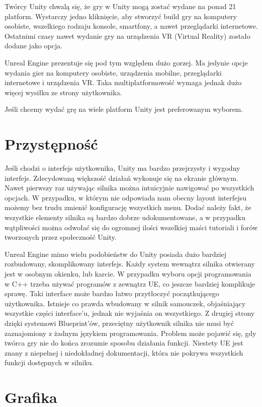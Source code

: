 \documentclass[12pt]{xmgr}
\begin{document}
Twórcy Unity chwalą się, że gry w Unity mogą zostać wydane na ponad 21 platform. Wystarczy jedno kliknięcie, aby stworzyć build gry na komputery osobiste, wszelkiego rodzaju konsole, smartfony, a nawet przeglądarki internetowe. Ostatnimi czasy nawet wydanie gry na urządzenia VR (Virtual Reality) zostało dodane jako opcja.

Unreal Engine prezentuje się pod tym względem dużo gorzej. Ma jedynie opcje wydania gier na komputery osobiste, urządzenia mobilne, przeglądarki internetowe i urządzenia VR. Taka multiplatformowość wymaga jednak dużo więcej wysiłku ze strony użytkownika.

Jeśli chcemy wydać grę na wiele platform Unity jest preferowanym wyborem.

\section{Przystępność}

Jeśli chodzi o interfejs użytkownika, Unity ma bardzo przejrzysty i wygodny interfejs. Zdecydowaną większość działań wykonuje się na ekranie głównym. Nawet pierwszy raz używając silnika można intuicyjnie nawigować po wszystkich opcjach.
W przypadku, w którym nie odpowiada nam obecny layout interfejsu możemy bez trudu zmienić konfigurację wszystkich menu.
Dodać należy fakt, że wszystkie elementy silnika są bardzo dobrze udokumentowane, a w przypadku wątpliwości można odwołać się do ogromnej ilości wszelkiej maści tutoriali i forów tworzonych przez społeczność Unity.

Unreal Engine mimo wielu podobieństw do Unity posiada dużo bardziej rozbudowany, skomplikowany interfejs. Każdy system wewnątrz silnika otwierany jest w osobnym okienku, lub karcie. W przypadku wyboru opcji programowania w C++ trzeba używać programów z zewnątrz UE, co jeszcze bardziej komplikuje sprawę. Taki interface może bardzo łatwo przytłoczyć początkującego użytkownika. Istnieje co prawda wbudowany w silnik samouczek, objaśniający wszystkie części interface’u, jednak nie wyjaśnia on wszystkiego.
Z drugiej strony dzięki systemowi Blueprint’ów, przeciętny użytkownik silnika nie musi być zaznajomiony z żadnym językiem programowania.
Problem może pojawić się, gdy twórca gry nie do końca zrozumie sposobu działania funkcji. Niestety UE jest znany z niepełnej i niedokładnej dokumentacji, która nie pokrywa wszystkich funkcji dostępnych w silniku.

\section{Grafika}
\end{document}
